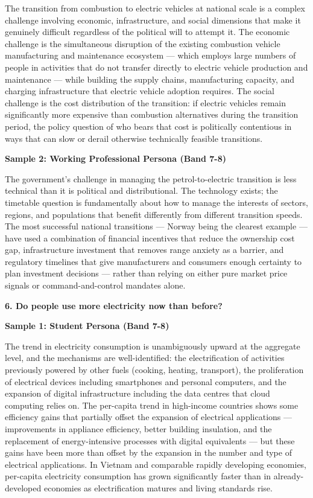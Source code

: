 The transition from combustion to electric vehicles at national scale is a complex challenge involving economic, infrastructure, and social dimensions that make it genuinely difficult regardless of the political will to attempt it. The economic challenge is the simultaneous disruption of the existing combustion vehicle manufacturing and maintenance ecosystem — which employs large numbers of people in activities that do not transfer directly to electric vehicle production and maintenance — while building the supply chains, manufacturing capacity, and charging infrastructure that electric vehicle adoption requires. The social challenge is the cost distribution of the transition: if electric vehicles remain significantly more expensive than combustion alternatives during the transition period, the policy question of who bears that cost is politically contentious in ways that can slow or derail otherwise technically feasible transitions.

\textbf{Sample 2: Working Professional Persona (Band 7-8)}

The government's challenge in managing the petrol-to-electric transition is less technical than it is political and distributional. The technology exists; the timetable question is fundamentally about how to manage the interests of sectors, regions, and populations that benefit differently from different transition speeds. The most successful national transitions — Norway being the clearest example — have used a combination of financial incentives that reduce the ownership cost gap, infrastructure investment that removes range anxiety as a barrier, and regulatory timelines that give manufacturers and consumers enough certainty to plan investment decisions — rather than relying on either pure market price signals or command-and-control mandates alone.

\separator

\begin{ieltsquestion}
\textbf{6. Do people use more electricity now than before?}
\end{ieltsquestion}
\textbf{Sample 1: Student Persona (Band 7-8)}

The trend in electricity consumption is unambiguously upward at the aggregate level, and the mechanisms are well-identified: the electrification of activities previously powered by other fuels (cooking, heating, transport), the proliferation of electrical devices including smartphones and personal computers, and the expansion of digital infrastructure including the data centres that cloud computing relies on. The per-capita trend in high-income countries shows some efficiency gains that partially offset the expansion of electrical applications — improvements in appliance efficiency, better building insulation, and the replacement of energy-intensive processes with digital equivalents — but these gains have been more than offset by the expansion in the number and type of electrical applications. In Vietnam and comparable rapidly developing economies, per-capita electricity consumption has grown significantly faster than in already-developed economies as electrification matures and living standards rise.

